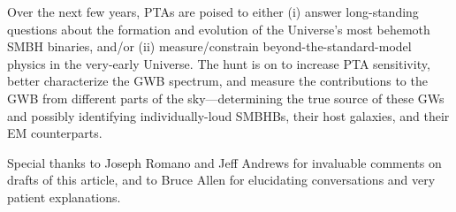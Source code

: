 \documentclass[onecolumn,authoryear]{els-mrw}
\begin{document}
Over the next few years, PTAs are poised to either (i) answer long-standing questions about the formation and evolution of the Universe's most behemoth SMBH binaries, and/or (ii) measure/constrain beyond-the-standard-model physics in the very-early Universe.  The hunt is on to increase PTA sensitivity, better characterize the GWB spectrum, and measure the contributions to the GWB from different parts of the sky---determining the true source of these GWs and possibly identifying individually-loud SMBHBs, their host galaxies, and their EM counterparts.







\begin{ack}[Acknowledgments]

Special thanks to Joseph Romano and Jeff Andrews for invaluable comments on drafts of this article, and to Bruce Allen for elucidating conversations and very patient explanations.
\end{ack}


% 


\end{document}
